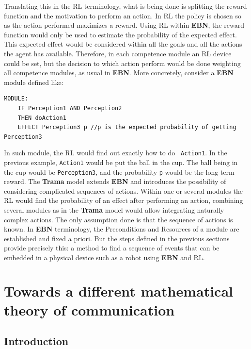 \documentclass[
		twoside,openright,titlepage,numbers=noenddot,manychapters,
		headinclude,%
                footinclude=false,cleardoublepage=empty,
                BCOR=5mm,
		fontsize=11pt, %
                 enabledeprecatedfontcommands]{scrreprt}
\begin{document}
Translating this in the RL terminology, what is being done is splitting the reward function and the motivation to perform an action. In RL the policy is chosen so as the action performed maximizes a reward. Using RL within \textbf{EBN}, the reward function would only be used to estimate the probability of the expected effect. This expected effect would be considered within all the goals and all the actions the agent has available. Therefore, in each competence module an RL  device could be set, but the decision to which action perform would be done weighting all competence modules, as usual in \textbf{EBN}. More concretely, consider a  \textbf{EBN} module defined like:

\begin{lstlisting}
MODULE:
	IF Perception1 AND Perception2
	THEN doAction1
	EFFECT Perception3 p //p is the expected probability of getting Perception3
\end{lstlisting}
In such module, the RL would find out exactly how to do \lstinline{ Action1}. In  the previous example, \lstinline{Action1} would be put the ball in the cup. The ball being in the cup would be \lstinline{Perception3}, and the probability \lstinline{p} would be the long term reward. The \textbf{Trama} model extends \textbf{EBN} and introduces the possibility of considering complicated sequences of actions. Within one or several modules the RL would find the probability of an effect after performing an action, combining several modules as in the \textbf{Trama} model would allow integrating naturally complex actions. The only assumption done is that the sequence of actions is known.  In \textbf{EBN} terminology, the Preconditions and Resources of a module are established and fixed a priori. But the steps defined in the previous sections provide precisely this: a method to find a sequence of events that can be embedded in a physical device such as a robot using \textbf{EBN} and RL.



\section[Towards a different theory of communication]{Towards a different mathematical theory of communication}
\label{different_communication}

\subsection{Introduction}
\end{document}
